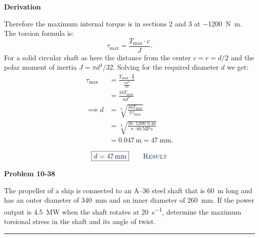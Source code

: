 \documentclass[a4paper]{article}
\newcounter{problem}
\numberwithin{equation}{problem}
\newenvironment{problem}[1]%
{%
  \par\vspace{0pt}%
  {\large\bfseries\sffamily\color{AUblueDark}%
    Problem #1%
  }%
  \par\vspace{.35\baselineskip}%
}%
{%
  \par\vspace{.6\baselineskip}%
  {\color{AUblueDark}\rule{\linewidth}{0.8pt}}%
  \vspace{.6\baselineskip}\par%
}
\newcommand{\AUheading}[1]{%
  \par\vspace{.4\baselineskip}%
  {\sffamily\bfseries\color{AUblueDark}#1\par}%
  \nobreak%
}
\newenvironment{derivation}[1][Derivation]{%
  \AUheading{#1}
  \begingroup\allowdisplaybreaks
  \setlength{\abovedisplayskip}{6pt}%
  \setlength{\belowdisplayskip}{6pt}%
  \setlength{\abovedisplayshortskip}{4pt}%
  \setlength{\belowdisplayshortskip}{4pt}%
}{\par\endgroup\medskip}
\newcommand{\finalresult}[1]{%
  \vspace{.2\baselineskip}%
  \begin{equation}
    {\color{AUblueDark}\boxed{\displaystyle #1}}
    \tag*{\textsc{\textcolor{AUblueDark}{Result}}}
  \end{equation}
  \newpage
}
\begin{document}
\begin{derivation}
  Therefore the maximum internal torque is in sections 2 and 3 at \qty{-1200}{\N.\m}.
  The torsion formula is:
  \[ 
  \tau_{\mathrm{max}} = \frac{T_{\mathrm{max}}\cdot c}{J}
  .\]
  For a solid circular shaft as here the distance from the center $c = r = d / 2$ and the polar moment of inertia $J = \pi d ^{4} / 32$.
  Solving for the required diameter $d$ we get:
  \begin{align*}
    \tau_{\mathrm{max}} &= \frac{T_{\mathrm{max}} \cdot \frac{d}{2}}{\frac{\pi d ^{4}}{32}} \\
            &= \frac{16 T_{\mathrm{max}}}{\pi d^3} \\
  \implies d &= \sqrt[3]{\frac{16 T_{\mathrm{max}}}{\pi \tau_{\mathrm{max}}}} \\
      &= \sqrt[3]{\frac{16 \cdot \qty{1200}{\N.\m}}{\pi \cdot \qty{60}{\MPa}}} \\
      &= \qty{0,047}{\m} = \qty{47}{\mm} 
  .\end{align*}
\end{derivation}

\finalresult{d = \qty{47}{\mm}}

\begin{problem}{10-38}
  The propeller of a ship is connected to an A--36 steel shaft that is \qty{60}{\m} long and has an outer diameter of \qty{340}{\mm} and an inner diameter of \qty{260}{\mm}.
  If the power output is \qty{4,5}{\MW} when the shaft rotates at \qty{20}{s^{-1}}, determine the maximum torsional stress in the shaft and its angle of twist.
\end{problem}
\end{document}
